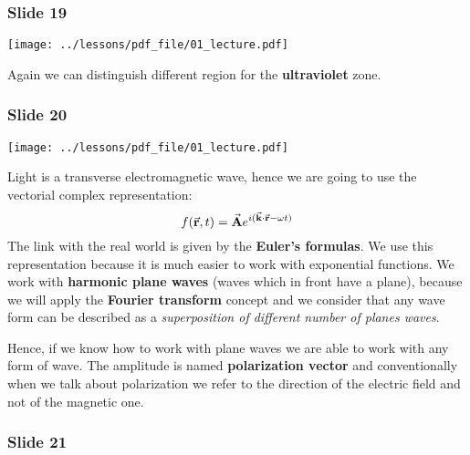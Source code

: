 \documentclass[../main/main.tex]{subfiles}
\begin{document}
\subsubsection*{Slide 19}

\begin{minipage}[]{0.5\linewidth}
\centering
\texttt{[image: ../lessons/pdf\_file/01\_lecture.pdf]}
\end{minipage}
\hspace{0.3cm}\vspace{0.3cm}
\begin{minipage}[c]{0.47\linewidth}
Again we can distinguish different region for the \textbf{ultraviolet} zone.
\end{minipage}

\subsubsection*{Slide 20}

\begin{minipage}[]{0.5\linewidth}
\centering
\texttt{[image: ../lessons/pdf\_file/01\_lecture.pdf]}
\end{minipage}
\hspace{0.3cm}\vspace{0.3cm}
\begin{minipage}[c]{0.47\linewidth}
Light is a transverse electromagnetic wave, hence we are going to use the vectorial complex representation:
\begin{equation*}
  f(\va{r},t) = \va{A} e^{i (\va{k}\cdot \va{r}- \omega t)}
\end{equation*}
The link with the real world is given by the \textbf{Euler's formulas}.
We use this representation because it is much easier to work with exponential functions.
We work with \textbf{harmonic plane waves} (waves which in front have a plane), because we will apply the \textbf{Fourier transform} concept and we consider that any wave form can be described as a \emph{superposition of different number of planes waves}.
\end{minipage}

Hence, if we know how to work with plane waves we are able to work with any form of wave.
The amplitude is named \textbf{polarization vector} and conventionally when we talk about polarization we refer to the direction of the electric field and not of the magnetic one.

\subsubsection*{Slide 21}
\end{document}
